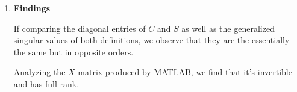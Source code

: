\begin{enumerate}[(1).]
        \item \textbf{Findings}
        
            If comparing the diagonal entries of $C$ and $S$ as well as the generalized singular values of both definitions, we observe that they are the essentially the same but in opposite orders.
        
            Analyzing the $X$ matrix produced by MATLAB, we find that it's invertible and has full rank.  
            
    \end{enumerate}
    








    
